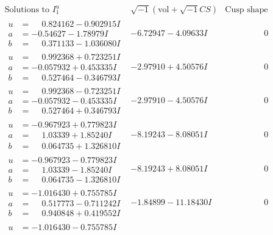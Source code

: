 \documentclass[1p]{elsarticle_modified}
\theoremstyle{definition}
\newcommand{\I}{\sqrt{-1}}
\begin{document}
$$\begin{array}{c|c|c}
\text{Solutions to }I^u_{1}& \I (\text{vol} + \sqrt{-1}CS) & \text{Cusp shape}\\
 \hline 
\begin{aligned}
u &= \phantom{-}0.824162 - 0.902915 I \\
a &= -0.54627 - 1.78979 I \\
b &= \phantom{-}0.371133 - 1.036080 I\end{aligned}
 & -6.72947 - 4.09633 I & \phantom{-0.000000 } 0 \\ \hline\begin{aligned}
u &= \phantom{-}0.992368 + 0.723251 I \\
a &= -0.057932 + 0.453335 I \\
b &= \phantom{-}0.527464 - 0.346793 I\end{aligned}
 & -2.97910 + 4.50576 I & \phantom{-0.000000 } 0 \\ \hline\begin{aligned}
u &= \phantom{-}0.992368 - 0.723251 I \\
a &= -0.057932 - 0.453335 I \\
b &= \phantom{-}0.527464 + 0.346793 I\end{aligned}
 & -2.97910 - 4.50576 I & \phantom{-0.000000 } 0 \\ \hline\begin{aligned}
u &= -0.967923 + 0.779823 I \\
a &= \phantom{-}1.03339 + 1.85240 I \\
b &= \phantom{-}0.064735 + 1.326810 I\end{aligned}
 & -8.19243 - 8.08051 I & \phantom{-0.000000 } 0 \\ \hline\begin{aligned}
u &= -0.967923 - 0.779823 I \\
a &= \phantom{-}1.03339 - 1.85240 I \\
b &= \phantom{-}0.064735 - 1.326810 I\end{aligned}
 & -8.19243 + 8.08051 I & \phantom{-0.000000 } 0 \\ \hline\begin{aligned}
u &= -1.016430 + 0.755785 I \\
a &= \phantom{-}0.517773 - 0.711242 I \\
b &= \phantom{-}0.940848 + 0.419552 I\end{aligned}
 & -1.84899 - 11.18430 I & \phantom{-0.000000 } 0 \\ \hline\begin{aligned}
u &= -1.016430 - 0.755785 I \\

\end{aligned}
\end{array}$$
\end{document}

